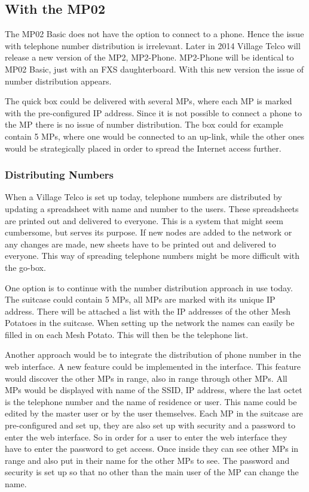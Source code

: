 \subsection{With the MP02}
The MP02 Basic does not have the option to connect to a phone. Hence the issue with telephone number distribution is irrelevant. Later in 2014 Village Telco will release a new version of the MP2, MP2-Phone. MP2-Phone will be identical to MP02 Basic, just with an FXS daughterboard. With this new version the issue of number distribution appears. 

The \gls{quick} box could be delivered with several MPs, where each MP is marked with the pre-configured IP address. Since it is not possible to connect a phone to the MP there is no issue of number distribution. The box could for example contain 5 MPs, where one would be connected to an up-link, while the other ones would be strategically placed in order to spread the Internet access further. 

\subsubsection{Distributing Numbers}
When a Village Telco is set up today, telephone numbers are distributed by updating a spreadsheet with name and number to the users. These spreadsheets are printed out and delivered to everyone. This is a system that might seem cumbersome, but serves its purpose. If new nodes are added to the network or any changes are made, new sheets have to be printed out and delivered to everyone. This way of spreading telephone numbers might be more difficult with the go-box. 

One option is to continue with the number distribution approach in use today. The suitcase could contain 5 MPs, all MPs are marked with its unique IP address. There will be attached a list with the IP addresses of the other Mesh Potatoes in the suitcase. When setting up the network the names can easily be filled in on each Mesh Potato. This will then be the telephone list.  

Another approach would be to integrate the distribution of phone number in the web interface. A new feature could be implemented in the interface. This feature would discover the other MPs in range, also in range through other MPs. All MPs would be displayed with name of the SSID, IP address, where the last octet is the telephone number and the name of residence or user. This name could be edited by the master user or by the user themselves. Each MP in the suitcase are pre-configured and set up, they are also set up with security and a password to enter the web interface. So in order for a user to enter the web interface they have to enter the password to get access. Once inside they can see other MPs in range and also put in their name for the other MPs to see. The password and security is set up so that no other than the main user of the MP can change the name. 


